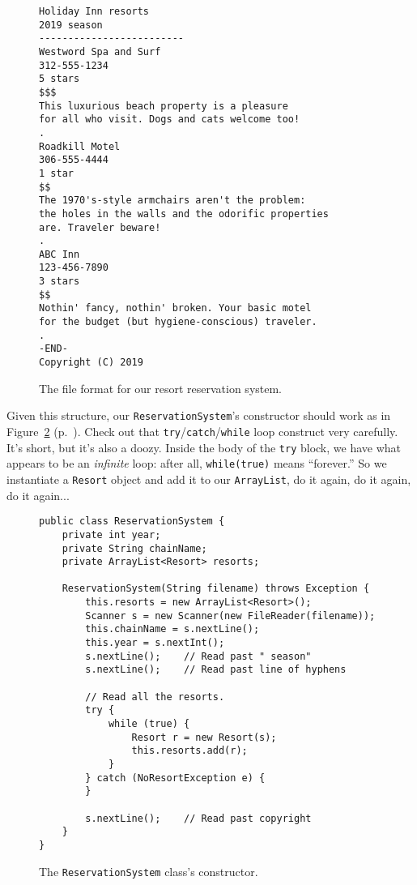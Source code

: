 \begin{figure}[ht]
\centering
\begin{Verbatim}[fontsize=\scriptsize,samepage=true,frame=lines]
Holiday Inn resorts
2019 season
-------------------------
Westword Spa and Surf
312-555-1234
5 stars
$$$
This luxurious beach property is a pleasure
for all who visit. Dogs and cats welcome too!
.
Roadkill Motel
306-555-4444
1 star
$$
The 1970's-style armchairs aren't the problem:
the holes in the walls and the odorific properties
are. Traveler beware!
.
ABC Inn
123-456-7890
3 stars
$$  
Nothin' fancy, nothin' broken. Your basic motel 
for the budget (but hygiene-conscious) traveler.
.   
-END- 
Copyright (C) 2019
\end{Verbatim}
\caption{The file format for our resort reservation system.}
\label{fig:wholeFile}
\end{figure}


Given this structure, our \texttt{ReservationSystem}'s constructor should work
as in Figure~\ref{fig:reservationSysClass}
(p.~\pageref{fig:reservationSysClass}). Check out that
\texttt{try}/\texttt{catch}/\texttt{while} loop construct very carefully. It's
short, but it's also a doozy. Inside the body of the \texttt{try} block, we
have what appears to be an \textit{infinite} loop: after all,
\texttt{while(true)} means ``forever.'' So we instantiate a \texttt{Resort}
object and add it to our \texttt{ArrayList}, do it again, do it again, do it
again...

\begin{figure}[ht]
\centering
\begin{Verbatim}[fontsize=\footnotesize,samepage=true,frame=single]
public class ReservationSystem {
    private int year;
    private String chainName;
    private ArrayList<Resort> resorts;

    ReservationSystem(String filename) throws Exception {
        this.resorts = new ArrayList<Resort>();
        Scanner s = new Scanner(new FileReader(filename));
        this.chainName = s.nextLine();
        this.year = s.nextInt();
        s.nextLine();    // Read past " season"
        s.nextLine();    // Read past line of hyphens

        // Read all the resorts.
        try {
            while (true) {
                Resort r = new Resort(s);
                this.resorts.add(r);
            }
        } catch (NoResortException e) {
        }

        s.nextLine();    // Read past copyright
    }
}
\end{Verbatim}
\caption{The \texttt{ReservationSystem} class's constructor.}
\label{fig:reservationSysClass}
\end{figure}


